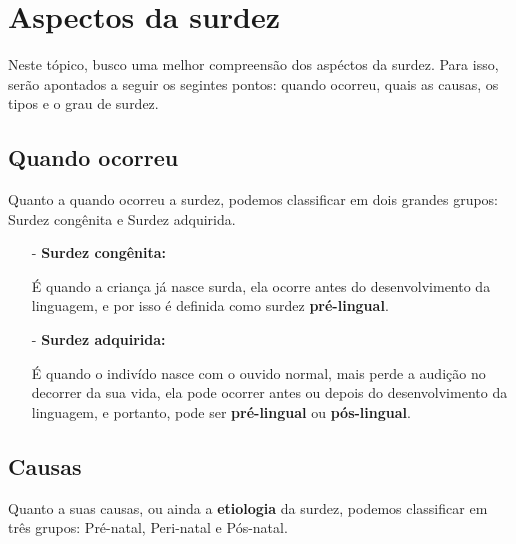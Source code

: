 \documentclass[brasil]{abnt}
\begin{document}
		\section{Aspectos da surdez}
			Neste tópico, busco uma melhor compreensão dos aspéctos da surdez. Para isso, serão apontados a seguir os segintes pontos: quando ocorreu, 
			quais as causas, os tipos e o grau de surdez. 
			
			\subsection{Quando ocorreu}
				Quanto a quando ocorreu a surdez, podemos classificar em dois grandes grupos: Surdez congênita e Surdez adquirida. 
				
				\begin{itemize}		
					\item [-]\textbf{Surdez congênita:} 
					
						É quando a criança já nasce surda, ela ocorre antes do desenvolvimento da linguagem, e por isso é definida como 
						surdez \textbf{pré-lingual}. 
						
					\item[-]\textbf{Surdez adquirida:} 
					
						É quando o indivído nasce com o ouvido normal, mais perde a audição no decorrer da sua vida, ela pode ocorrer antes ou depois do 
						desenvolvimento da linguagem, e portanto, pode ser \textbf{pré-lingual} ou \textbf{pós-lingual}.
				\end{itemize}
				
				
			\subsection{Causas}
				Quanto a suas causas, ou ainda a \textbf{etiologia} da surdez, podemos classificar em três grupos: Pré-natal, Peri-natal e Pós-natal.
			
\end{document}
